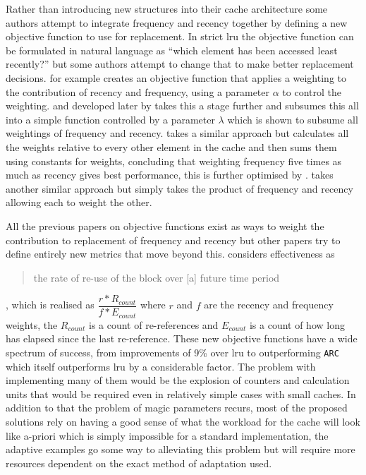 Rather than introducing new structures into their cache architecture some authors attempt to integrate frequency and recency together by defining a new objective function to use for replacement. In strict \gls{lru} the objective function can be formulated in natural language as ``which element has been accessed least recently?'' but some authors attempt to change that to make better replacement decisions. \citet{reddyIntelligentWebCaching1998} for example creates an objective function that applies a weighting to the contribution of recency and frequency, using a parameter $\alpha$ to control the weighting. \citeauthor{dongheeleeImplementationPerformanceEvaluation1997} \cite{dongheeleeLRFUSpectrumPolicies2001} and developed later by \citet{cuiNewHybridApproach2003} takes this a stage further and subsumes this all into a simple function controlled by a parameter $\lambda$ which is shown to subsume all weightings of frequency and recency. \citet{abdelfattahLeastRecentlyFive2012} takes a similar approach but calculates all the weights relative to every other element in the cache and then sums them using constants for weights, concluding that weighting frequency five times as much as recency gives best performance, this is further optimised by \citet{anandkumarHybridCacheReplacement2014}. \citet{dasArbitrationCacheReplacements2016} takes another similar approach but simply takes the product of frequency and recency allowing each to weight the other.

All the previous papers on objective functions exist as ways to weight the contribution to replacement of frequency and recency but other papers try to define entirely new metrics that move beyond this. \citet{tianEffectivenessbasedAdaptiveCache2014} considers effectiveness as \blockcquote{tianEffectivenessbasedAdaptiveCache2014}{the rate of re-use of the block over [a] future time period}, which is realised as $\dfrac{r*R_{count}}{f*E_{count}}$ where $r$ and $f$ are the recency and frequency weights, the $R_{count}$ is a count of re-references and $E_{count}$ is a count of how long has elapsed since the last re-reference. These new objective functions have a wide spectrum of success, from improvements of 9\% over \gls{lru} to outperforming \texttt{ARC} which itself outperforms \gls{lru} by a considerable factor. The problem with implementing many of them would be the explosion of counters and calculation units that would be required even in relatively simple cases with small caches. In addition to that the problem of magic parameters recurs, most of the proposed solutions rely on having a good sense of what the workload for the cache will look like a-priori which is simply impossible for a standard implementation, the adaptive examples go some way to alleviating this problem but will require more resources dependent on the exact method of adaptation used.

